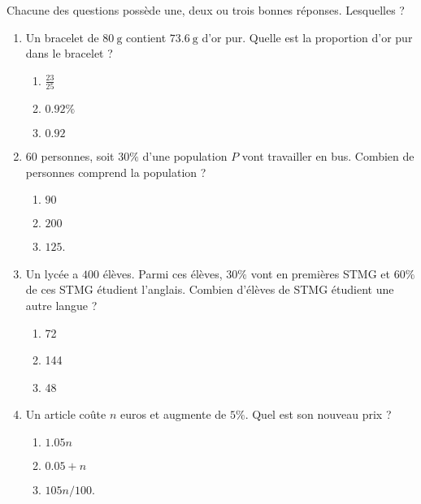 
\begin{exercice}\label{exoPremiere-0014}

    Chacune des questions possède une, deux ou trois bonnes réponses. Lesquelles ?
    \begin{multicols}{2}
    \begin{enumerate}
    \item
        Un bracelet de \( \SI{80}{\gram}\) contient \( \SI{73.6}{\gram}\) d'or pur. Quelle est la proportion d'or pur dans le bracelet ?
        \begin{enumerate}
            \item
        \( \frac{ 23 }{ 25 }\)
    \item
        \( 0.92\%\)
    \item
        \( 0.92\)

        \end{enumerate}

    \item
        \( 60\) personnes, soit \( 30\%\) d'une population \( P\) vont travailler en bus. Combien de personnes comprend la population ?
        \begin{enumerate}
            \item
                $90$
            \item
                \( 200\)
            \item
                \( 125\).
        \end{enumerate}
    \item
        Un lycée a \( 400\) élèves. Parmi ces élèves, \( 30\%\) vont en premières STMG et \( 60\%\) de ces STMG étudient l'anglais. Combien d'élèves de STMG étudient une autre langue ?
        \begin{enumerate}
            \item
                72
            \item
                144
            \item
                48
        \end{enumerate}
    \item
        Un article coûte \( n\) euros et augmente de \( 5\%\). Quel est son nouveau prix ?
        \begin{enumerate}
            \item
                \( 1.05n\)
            \item
                \( 0.05+n\)
            \item
                \( 105n/100\).
        \end{enumerate}


\end{enumerate}
\end{multicols}
\end{exercice}
